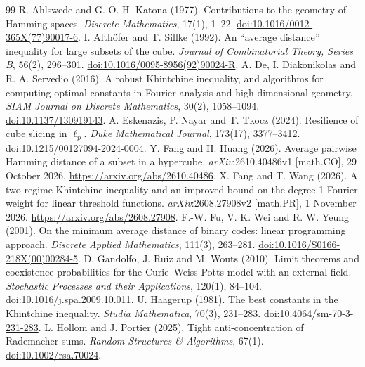 \documentclass[11pt,a4paper]{article}
\numberwithin{equation}{section}
\theoremstyle{remark}
\begin{document}
\begin{thebibliography}{99}\small
{}
R. Ahlswede and G. O. H. Katona (1977). Contributions to the geometry of
Hamming spaces. \emph{Discrete Mathematics}, 17(1), 1--22.
\href{https://doi.org/10.1016/0012-365X(77)90017-6}{doi:10.1016/0012-365X(77)90017-6}.
I. Alth\"ofer and T. Sillke (1992). An ``average distance'' inequality for
large subsets of the cube. \emph{Journal of Combinatorial Theory, Series B},
56(2), 296--301.
\href{https://doi.org/10.1016/0095-8956(92)90024-R}{doi:10.1016/0095-8956(92)90024-R}.
A. De, I. Diakonikolas and R. A. Servedio (2016). A robust Khintchine
inequality, and algorithms for computing optimal constants in Fourier
analysis and high-dimensional geometry. \emph{SIAM Journal on Discrete
Mathematics}, 30(2), 1058--1094.
\href{https://doi.org/10.1137/130919143}{doi:10.1137/130919143}.
A. Eskenazis, P. Nayar and T. Tkocz (2024). Resilience of cube slicing in
$\ell_p$. \emph{Duke Mathematical Journal}, 173(17), 3377--3412.
\href{https://doi.org/10.1215/00127094-2024-0004}{doi:10.1215/00127094-2024-0004}.
Y. Fang and H. Huang (2026). Average pairwise Hamming distance of a subset
in a hypercube. \emph{arXiv}:2610.40486v1 [math.CO], 29 October 2026.
\url{https://arxiv.org/abs/2610.40486}.
X. Fang and T. Wang (2026). A two-regime Khintchine inequality and an
improved bound on the degree-1 Fourier weight for linear threshold
functions. \emph{arXiv}:2608.27908v2 [math.PR], 1 November 2026.
\url{https://arxiv.org/abs/2608.27908}.
F.-W. Fu, V. K. Wei and R. W. Yeung (2001). On the minimum average distance
of binary codes: linear programming approach. \emph{Discrete Applied
Mathematics}, 111(3), 263--281.
\href{https://doi.org/10.1016/S0166-218X(00)00284-5}{doi:10.1016/S0166-218X(00)00284-5}.
D. Gandolfo, J. Ruiz and M. Wouts (2010). Limit theorems and coexistence
probabilities for the Curie--Weiss Potts model with an external field.
\emph{Stochastic Processes and their Applications}, 120(1), 84--104.
\href{https://doi.org/10.1016/j.spa.2009.10.011}{doi:10.1016/j.spa.2009.10.011}.
U. Haagerup (1981). The best constants in the Khintchine inequality.
\emph{Studia Mathematica}, 70(3), 231--283.
\href{https://doi.org/10.4064/sm-70-3-231-283}{doi:10.4064/sm-70-3-231-283}.
L. Hollom and J. Portier (2025). Tight anti-concentration of Rademacher
sums. \emph{Random Structures \& Algorithms}, 67(1).
\href{https://doi.org/10.1002/rsa.70024}{doi:10.1002/rsa.70024}.

\end{thebibliography}
\end{document}
